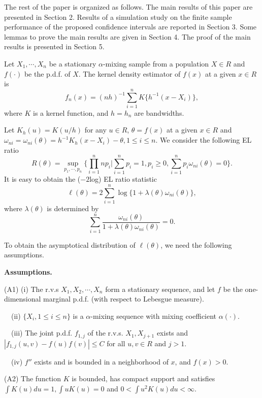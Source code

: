 \documentclass[12pt]{article}
\def\be{\begin{equation}}
\def\ee{\end{equation}}
\begin{document}
The rest of the paper is organized as follows. The main results of this paper are presented in Section 2.
Results of a simulation study on the finite sample performance of the proposed confidence
intervals are reported in Section 3.
Some lemmas to prove the main results are given in Section 4. The proof of the main results is  presented in
Section 5.

\bigskip
\setcounter{section}{2}
\setcounter{equation}{0}
\bigskip

Let $X_1,\cdots, X_n$ be a stationary $\alpha$-mixing sample from a
population $X\in R$ and $f(\cdot)$ be the p.d.f. of
$X$. The kernel density estimator of $f(x)$ at a
given $x\in R$ is
\be
f_n(x)=(nh)^{-1}\sum_{i=1}^nK\{h^{-1}(x-X_i)\},
\ee
where $K$ is a kernel function, and $h=h_n$ are bandwidths.

Let $K_h(u)=K(u/h)$ for any $u\in R$, $\theta=f(x)$ at a
given $x\in R$ and $\omega_{ni}=\omega_{ni}(\theta)=h^{-1}K_h(x-X_i)-\theta, 1\leq i\leq n$.
We consider the following EL ratio
 $$R(\theta) = \sup\limits_{p_1, \cdots, p_n}\{\prod_{i=1}^{n}np_i|
 \sum_{i=1}^{n} p_i=1, p_i\geq 0 ,
 \sum_{i=1}^{n} p_i\omega_{ni}(\theta)=0\}.$$
 It is easy to obtain the ($-2$log)  EL ratio statistic
 \be
\ell(\theta)=2\sum_{i=1}^{n} \log \{1+\lambda(\theta)\omega_{ni}(\theta)\},
\label{lambda0}
 \ee
 where $\lambda(\theta)$ is determined by
\be
\sum_{i=1}^{n}
 \frac{\omega_{ni}(\theta)}{1+\lambda(\theta)\omega_{ni}(\theta)}=0.
 \label{lambda}
\ee

 To obtain the asymptotical
distribution of $\ell(\theta)$, we need the following assumptions.

\smallskip

{\bf Assumptions.}

(A1)  (i) The r.v.s $X_1, X_2, \cdots, X_n$ form a stationary sequence, and let $f$ be the one-dimensional
marginal p.d.f. (with respect to Lebesgue measure).

\ \ (ii) $\{X_i, 1\leq i\leq n\}$ is a $\alpha$-mixing sequence with mixing coefficient $\alpha(\cdot)$.

\ \ (iii) The joint p.d.f.  $f_{1, j}$  of the r.v.s. $X_1, X_{j+1}$ exists and $|f_{1, j}(u, v)-f(u)f(v)|\leq C$
 for all $u, v\in R$ and $j>1$.

 \ \ (iv) $f''$ exists and is bounded in a neighborhood of $x$, and $f(x)>0$.

(A2)     The function $K$ is bounded, has compact support and satisfies $\int K(u)du=1, \int uK(u)=0$ and  $0<\int u^2K(u)du<\infty$.
\end{document}
